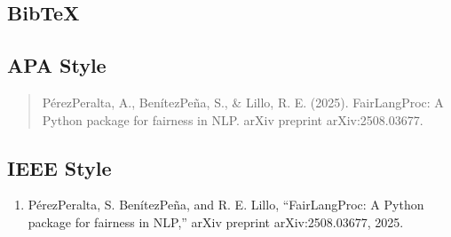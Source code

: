 \documentclass[letterpaper,10pt,english]{sphinxmanual}
\begin{document}
\subsection{BibTeX}
\label{\detokenize{citation:bibtex}}
\begin{sphinxVerbatim}[commandchars=\\\{\}]
\end{sphinxVerbatim}


\subsection{APA Style}
\label{\detokenize{citation:apa-style}}\begin{quote}

\sphinxAtStartPar
Pérez\sphinxhyphen{}Peralta, A., Benítez\sphinxhyphen{}Peña, S., \& Lillo, R. E. (2025). FairLangProc: A Python package for fairness in NLP. arXiv preprint arXiv:2508.03677.
\end{quote}


\subsection{IEEE Style}
\label{\detokenize{citation:ieee-style}}\begin{enumerate}
%
\item {} 
\sphinxAtStartPar
Pérez\sphinxhyphen{}Peralta, S. Benítez\sphinxhyphen{}Peña, and R. E. Lillo, “FairLangProc: A Python package for fairness in NLP,” arXiv preprint arXiv:2508.03677, 2025.

\end{enumerate}
\end{document}
